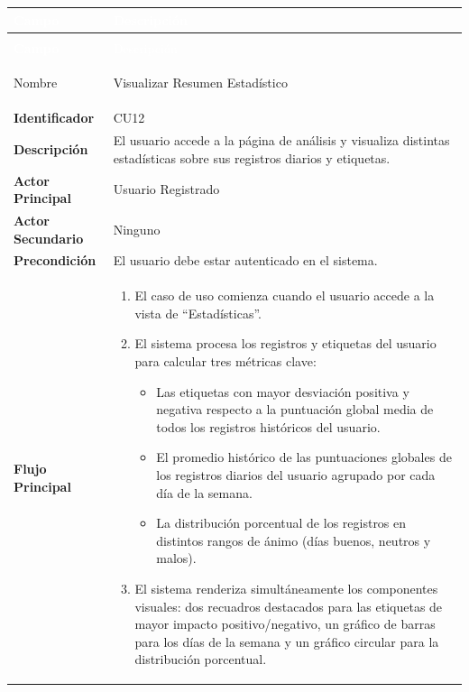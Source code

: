 \begingroup
\small 
\renewcommand{\arraystretch}{1.4}
\begin{xltabular}{\textwidth}{|>{\bfseries}p{3.5cm}|X|}
    \textcolor{white}{Campo} & \textcolor{white}{Descripción} \\ \hline
    \endfirsthead

     \\
    \hline
    \textcolor{white}{Campo} & \textcolor{white}{Descripción} \\ \hline
    \endhead

    Nombre & Visualizar Resumen Estadístico \\ \hline
    Identificador & CU12 \\ \hline
    Descripción & El usuario accede a la página de análisis y visualiza distintas estadísticas sobre sus registros diarios y etiquetas. \\ \hline
    Actor Principal & Usuario Registrado \\ \hline
    Actor Secundario & Ninguno \\ \hline
    Precondición & El usuario debe estar autenticado en el sistema. \\ \hline
    Flujo Principal & 
    \begin{enumerate}[leftmargin=0.5cm, topsep=0pt, partopsep=0pt, parsep=0pt, itemsep=4pt]
        \item El caso de uso comienza cuando el usuario accede a la vista de ``Estadísticas''.
        \item El sistema procesa los registros y etiquetas del usuario para calcular tres métricas clave:
        \begin{itemize}[leftmargin=0.5cm, topsep=2pt, itemsep=2pt]
            \item Las etiquetas con mayor desviación positiva y negativa respecto a la puntuación global media de todos los registros históricos del usuario.
            \item El promedio histórico de las puntuaciones globales de los registros diarios del usuario agrupado por cada día de la semana.
            \item La distribución porcentual de los registros en distintos rangos de ánimo (días buenos, neutros y malos).
        \end{itemize}
        \item El sistema renderiza simultáneamente los componentes visuales: dos recuadros destacados para las etiquetas de mayor impacto positivo/negativo, un gráfico de barras para los días de la semana y un gráfico circular para la distribución porcentual.

\end{enumerate}
\end{xltabular}
